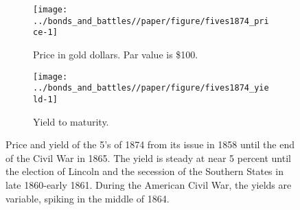 \begin{figure}[!]
  \centering
  \begin{subfigure}[b]{\linewidth}
   \texttt{[image: ../bonds\_and\_battles//paper/figure/fives1874\_price-1]}
  \caption{Price in gold dollars. Par value is \$100.}
  \label{bonds_battles:fig:fives1874_price}
\end{subfigure}
\begin{subfigure}[b]{\linewidth}
   \texttt{[image: ../bonds\_and\_battles//paper/figure/fives1874\_yield-1]}
  \caption{Yield to maturity.}
  \label{bonds_battles:fig:fives1874_yield}
\end{subfigure}
\caption[Price and yield of the 5's of 1874, 1858-1865]{Price and yield of the 5's of 1874 from its issue in 1858 until the end of the Civil War in 1865.
The yield is steady at near 5 percent until the election of Lincoln and the secession of the Southern States in late 1860-early 1861.
During the American Civil War, the yields are variable, spiking in the middle of 1864.
 }
\label{bonds_battles:fig:fives1874_yield_price}
\end{figure}

